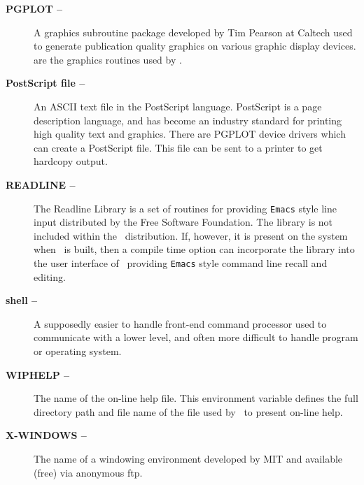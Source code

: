 \begin{description}
  \item[{\bf PGPLOT --}]
    A graphics subroutine package developed by Tim Pearson at Caltech used
    to generate publication quality graphics on various graphic display devices.
    are the graphics routines used by \wip.
  \item[{\bf PostScript file --}]  An ASCII
    text file in the PostScript language.  PostScript is a page
    description language, and has become an industry standard
    for printing high quality text and graphics.  There are
    PGPLOT device drivers which can create a PostScript
    file.  This file can be sent to a printer to get hardcopy output.
  \item[{\bf READLINE --}] The
    Readline Library%
    is a set of routines for providing {\tt Emacs} style line input
    distributed by the Free Software Foundation.
    The library is not included within the \wip\ distribution.
    If, however, it is present on the system when \wip\ is built,
    then a compile time option can incorporate the library into
    the user interface of \wip\ providing {\tt Emacs} style command line
    recall and editing.
  \item[{\bf shell --}] A supposedly easier to handle
    front-end command processor used to communicate with a lower level,
    and often more difficult to handle program or operating system.
  \item[{\bf WIPHELP --}] 
    The name of the on-line help file.
    This environment variable defines the full directory path and file name
    of the file used by \wip\ to present on-line help.
  \item[{\bf X-WINDOWS --}]  The name of a windowing
    environment developed by MIT and available (free) via anonymous ftp.
\end{description}
